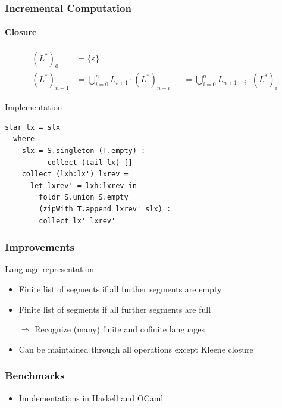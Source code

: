 \documentclass[pdftex]{beamer}
\begin{document}
\begin{frame}[fragile]
  \frametitle{Incremental Computation}
  \framesubtitle{Closure}
  \vspace{-2\baselineskip}
  \begin{align*}
    (L^*)_0 & = \{\varepsilon\} \\
    (L^*)_{n+1} & = \bigcup_{i=0}^n L_{i+1} \cdot (L^*)_{n-i}
                  &&= \bigcup_{i=0}^n L_{n+1-i} \cdot (L^*)_i
  \end{align*}
  \begin{block}{Implementation}
\begin{lstlisting}[numbers=none]
star lx = slx
  where
    slx = S.singleton (T.empty) :
          collect (tail lx) []
    collect (lxh:lx') lxrev =
      let lxrev' = lxh:lxrev in
        foldr S.union S.empty
        (zipWith T.append lxrev' slx) :
        collect lx' lxrev'
\end{lstlisting}
  \end{block}
\end{frame}
\begin{frame}
  \frametitle{Improvements}
  \begin{block}{Language representation}
  \begin{itemize}
  \item Finite list of segments if all further segments are empty
  \item Finite list of segments if all further segments are full
  \item[$\Rightarrow$] Recognize (many) finite and cofinite languages
  \item Can be maintained through all operations except Kleene closure
  \end{itemize}
\end{block}
\end{frame}
\begin{frame}
  \frametitle{Benchmarks}
    \begin{itemize}
    \item Implementations in Haskell and OCaml
    \end{itemize}
\end{frame}
\end{document}

